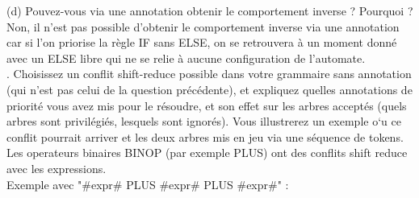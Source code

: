 \documentclass{report}
\begin{document}
    \quad (d) Pouvez-vous via une annotation obtenir le comportement inverse ? Pourquoi ?\\

    \quad Non, il n'est pas possible d'obtenir le comportement inverse via une annotation car si l'on priorise la règle IF sans ELSE, on se retrouvera à un moment donné avec un ELSE libre qui ne se relie à aucune configuration de l'automate.\\

    . Choisissez un conflit shift-reduce possible dans votre grammaire sans annotation (qui
    n'est pas celui de la question précédente), et expliquez quelles annotations de priorité
    vous avez mis pour le résoudre, et son effet sur les arbres acceptés (quels arbres sont
    privilégiés, lesquels sont ignorés). Vous illustrerez un exemple o`u ce conflit pourrait
    arriver et les deux arbres mis en jeu via une séquence de tokens.\\

    \quad Les operateurs binaires BINOP (par exemple PLUS) ont des conflits shift reduce avec les expressions.\\

    \quad Exemple avec "\#expr\# PLUS \#expr\# PLUS \#expr\#"  :\\
\end{document}
